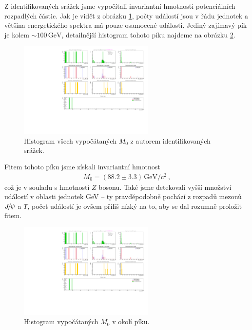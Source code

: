 \documentclass[10pt,a4paper]{article}
\renewcommand{\U}[1]{\ensuremath{\,\mathrm{#1}}}
\newcommand{\°}{\degree}
\newcommand{\Jpsi}{\ensuremath{J \hspace{-2pt} / \hspace{-1pt} \psi}}
\begin{document}
Z identifikovaných srážek jsme vypočítali invariantní hmotnosti potenciálních rozpadlých částic. Jak je vidět z obrázku \ref{obr:c0-full}, počty událostí jsou v řádu jednotek a většina energetického spektra má pouze osamocené události. Jediný zajímavý pík je kolem ${\sim} 100 \U{GeV}$, detailnější histogram tohoto píku najdeme na obrázku \ref{obr:c0-Z}.

\begin{figure}[h]
    \centering
    \includegraphics[width=0.6\textwidth]{c0_full.pdf}
    \vspace{-\baselineskip}
    \caption{Histogram všech vypočátaných $M_0$ z autorem identifikovaných srážek.}
    \label{obr:c0-full}
\end{figure}

\noindent
Fitem tohoto píku jsme získali invariantní hmotnost
\begin{align*}
    M_0 = (88.2 \pm 3.3) \U{GeV/c^2} \: ,
\end{align*}
což je v souladu s hmotností $Z$ bosonu. Také jsme detekovali vyšší množství událostí v oblasti jednotek GeV – ty pravděpodobně pochází z rozpadů mezonů $\Jpsi$ a $\Upsilon$, počet událostí je ovšem příliš nízký na to, aby se dal rozumně proložit fitem.

\begin{figure}[h]
    \centering
    \includegraphics[width=0.6\textwidth]{c0_Z.pdf}
    \vspace{-\baselineskip}
    \caption{Histogram vypočátaných $M_0$ v okolí píku.}
    \label{obr:c0-Z}
\end{figure}
\end{document}

